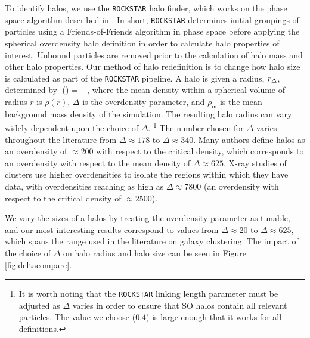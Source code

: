 \documentclass[usenatbib,fleqn]{mnras}
\begin{document}
To identify halos, we use the {\tt ROCKSTAR} halo finder, which works on the phase space algorithm described in \citet*{behroozi_etal13a}. In short, {\tt ROCKSTAR} determines initial groupings of particles using a Friends-of-Friends algorithm in phase space before applying the spherical overdensity halo definition in order to calculate halo properties of interest. Unbound particles are removed prior to the calculation of halo mass and other halo properties. Our method of halo redefinition is to change how halo size is calculated as part of the {\tt ROCKSTAR} pipeline. A halo is given a radius, $r_{\Delta}$, determined by
\beq
	\bar{\rho}(\Rdel) = \Delta \rho_{}, 
\eeq
where the mean density within a spherical volume of radius $r$ is $\bar{\rho}(r)$, $\Delta$ is the overdensity parameter, and $\rho_{\mathrm{m}}$ is the mean background mass density of the simulation. The resulting halo radius can vary widely dependent upon the choice of $\Delta$. \footnote{It is worth noting that the {\tt ROCKSTAR} linking length parameter must be adjusted as $\Delta$ varies in order to ensure that SO halos contain all relevant particles. The value we choose ($0.4$) is large enough that it works for all definitions.} The number chosen for $\Delta$ varies throughout the literature from $\Delta \approx 178$ to $\Delta \approx 340$. Many authors define halos as an overdensity of $\approx 200$ with respect to the critical density, which corresponds to an overdensity with respect to the mean density of $\Delta \approx 625$. X-ray studies of clusters use higher overdensities to isolate the regions within which they have data, with overdensities reaching as high as $\Delta \approx 7800$ (an overdensity with respect to the critical density of $\approx 2500$). 

We vary the sizes of a halos by treating the overdensity parameter as tunable, and our most interesting results correspond to values from $\Delta \approx 20$ to $\Delta \approx 625$, which spans the range used in the literature on galaxy clustering. 
The impact of the choice of $\Delta$ on halo radius and halo size can be seen in Figure \ref{fig:deltacompare}.
\end{document}
